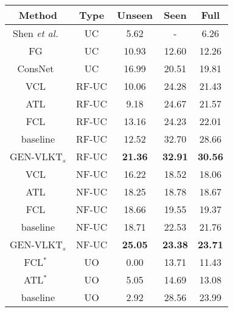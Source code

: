 \documentclass[10pt,twocolumn,letterpaper]{article}
\begin{document}
\begin{table}[t]
\small
  \begin{center}
  \begin{tabular}{ccccc}
  \hline
  Method        &Type  & Unseen & Seen & Full \\
  \hline\hline
  Shen \emph{et al.}~\cite{shen2018scaling}      		&UC				    & 5.62  & - & 6.26\\
  FG~\cite{Bansal2020_aaai_functional}      		&UC				    & 10.93  & 12.60 & 12.26\\
  ConsNet~\cite{liu2020consnet}      		&UC				    & 16.99  & 20.51 & 19.81\\
  \hline
  VCL~\cite{hou2020visual}      		&RF-UC				    & 10.06  & 24.28 & 21.43\\
  ATL~\cite{hou2021affordance}      		&RF-UC				    & 9.18  & 24.67 & 21.57\\
  FCL~\cite{hou2021detecting}      		&RF-UC				    & 13.16  & 24.23 & 22.01\\
  \cellcolor{mygray-bg}baseline			 	&\cellcolor{mygray-bg}RF-UC			        &\cellcolor{mygray-bg}12.52  &\cellcolor{mygray-bg}32.70  &\cellcolor{mygray-bg}28.66\\
  \cellcolor{mygray-bg}GEN-VLKT$_s$			 	&\cellcolor{mygray-bg}RF-UC			        &\cellcolor{mygray-bg}\textbf{21.36}  &\cellcolor{mygray-bg}\textbf{32.91}  &\cellcolor{mygray-bg}\textbf{30.56}\\
  \hline 
  VCL~\cite{hou2020visual}      		&NF-UC				    & 16.22  & 18.52 & 18.06\\
  ATL~\cite{hou2021affordance}      		&NF-UC				    & 18.25  & 18.78 & 18.67\\
  FCL~\cite{hou2021detecting}      		&NF-UC				    & 18.66  & 19.55 & 19.37\\
  \cellcolor{mygray-bg}baseline		 	&\cellcolor{mygray-bg}NF-UC			        &\cellcolor{mygray-bg}18.71  &\cellcolor{mygray-bg}22.53  &\cellcolor{mygray-bg}21.76\\
  \cellcolor{mygray-bg}GEN-VLKT$_s$			 	&\cellcolor{mygray-bg}NF-UC			        &\cellcolor{mygray-bg}\textbf{25.05}  &\cellcolor{mygray-bg}\textbf{23.38}  &\cellcolor{mygray-bg}\textbf{23.71}\\
  \hline 
  FCL$^*$~\cite{hou2021detecting}      		&UO				    & 0.00  & 13.71 & 11.43\\
  ATL$^*$~\cite{hou2021affordance}      		&UO				    & 5.05  & 14.69 & 13.08\\
  \cellcolor{mygray-bg}baseline			 	&\cellcolor{mygray-bg}UO			        &\cellcolor{mygray-bg}2.92  &\cellcolor{mygray-bg}28.56  &\cellcolor{mygray-bg}23.99\\

\end{tabular}
\end{center}
\end{table}
\end{document}
